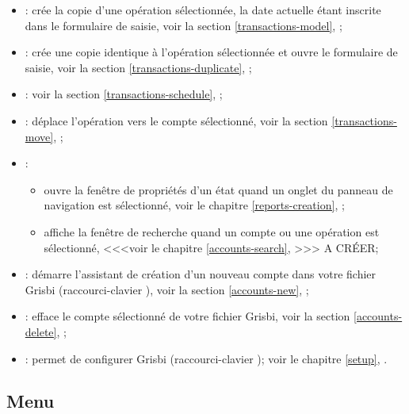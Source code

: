 \begin{itemize}	
\item {}: crée la copie d'une opération sélectionnée, la date actuelle étant inscrite dans le formulaire de saisie, voir la section \vref{transactions-model}, ;
\item {}: crée une copie identique à l'opération sélectionnée et ouvre le formulaire de saisie, voir la section \vref{transactions-duplicate}, ;
\item {}: voir la section \vref{transactions-schedule}, ;
\item {}: déplace l'opération vers le compte sélectionné, voir la section \vref{transactions-move}, ;
\item {}:
	\begin{itemize}
 		\item ouvre la fenêtre de propriétés d'un état quand un onglet du panneau de navigation est sélectionné, voir le chapitre \vref{reports-creation}, ;
		\item affiche la fenêtre de recherche quand un compte ou une opération est sélectionné, <<<voir le chapitre \vref{accounts-search}, >>> A CRÉER; %
	\end{itemize}
\item {}: démarre l'assistant de création d'un nouveau compte dans votre fichier Grisbi (raccourci-clavier ), voir la section \vref{accounts-new}, ;
\item {}: efface le compte sélectionné de votre fichier Grisbi, voir la section \vref{accounts-delete}, ;
\item {}: permet de configurer Grisbi (raccourci-clavier ); voir le chapitre \vref{setup}, .
\end{itemize}


\subsection{Menu \label{home-menus-display}}

